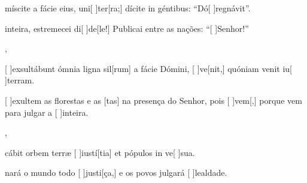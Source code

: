 {  {\item {}míscite a fácie eius, uni[ ]{ter}[ra;] dícite in géntibus: ``Dó[ ]{re}{gná}vit''.~\Antiphona}%
    {\item {} inteira, estremecei di[ ]{de}[le!] Publicai entre as nações: ``[ ]{Se}{nhor}!''~\Antiphona},
  {\item {}[ ]{ex}sultábunt ómnia ligna sil[rum] a fácie Dómini, [ ]{ve}[nit,] quóniam venit iu[ ]{ter}ram.~\Antiphona}%
    {\item {}[ ]{e}xultem as florestas e as [tas] na presença do Senhor, pois [ ]{vem}[,] porque vem para julgar a [ ]{in}{tei}ra.~\Antiphona},
  {\item {}cábit orbem terræ [ ]{iu}{stí}[tia] et pópulos in ve[ ]{su}a.~\Antiphona}%
    {\item {}nará o mundo todo [ ]{jus}{ti}[ça,] e os povos julgará [ ]{le}{al}{da}de.~\Antiphona}
}
